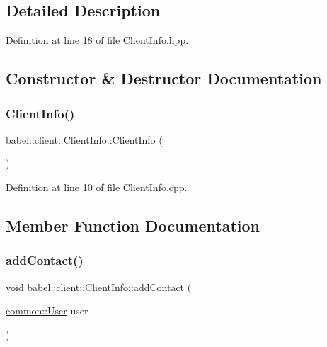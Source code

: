 \subsection{Detailed Description}


Definition at line 18 of file Client\+Info.\+hpp.



\subsection{Constructor \& Destructor Documentation}
\mbox{\label{classbabel_1_1client_1_1_client_info_a8a2766895591fac80b31912cb79c318c}} 
\subsubsection{\texorpdfstring{Client\+Info()}{ClientInfo()}}
{\footnotesize\ttfamily babel\+::client\+::\+Client\+Info\+::\+Client\+Info (\begin{DoxyParamCaption}{ }\end{DoxyParamCaption})}



Definition at line 10 of file Client\+Info.\+cpp.



\subsection{Member Function Documentation}
\mbox{\label{classbabel_1_1client_1_1_client_info_a0f19c690db9036d424ea8f70902acef0}} 
\subsubsection{\texorpdfstring{add\+Contact()}{addContact()}}
{\footnotesize\ttfamily void babel\+::client\+::\+Client\+Info\+::add\+Contact (\begin{DoxyParamCaption}\item[{\mbox{\hyperlink{classbabel_1_1common_1_1_user}{common\+::\+User}}}]{user }\end{DoxyParamCaption})}



